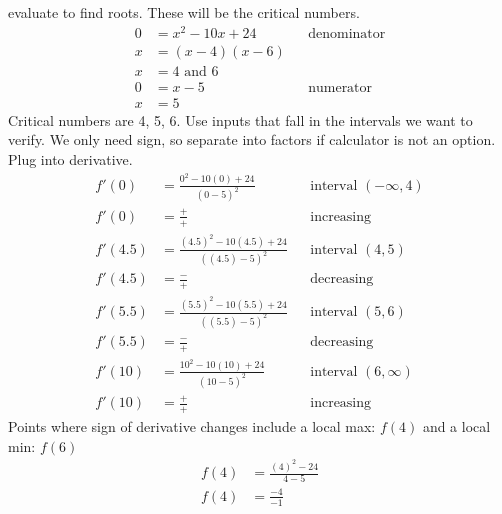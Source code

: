 \documentclass{article}
\begin{document}
\begin{description}
\begin{description}
                evaluate to find roots. These will be the critical numbers.
                \begin{align*}
                  0 & = x^2 - 10x + 24   &  & \text{denominator} \\
                  x & = (x - 4)(x - 6)                           \\
                  x & = 4 \text{ and } 6                         \\[2em]
                  0 & = x - 5            &  & \text{numerator}   \\
                  x & = 5
                \end{align*}
                Critical numbers are 4, 5, 6. Use inputs that fall in the intervals we want to verify. We only need
                sign, so separate into factors if calculator is not an option.
                Plug into derivative.
                \begin{align*}
                  f'(0)   & = \frac{0^2 - 10(0) + 24}{(0 - 5)^2}           &  & \text{interval $(-\infty, 4)$} \\
                  f'(0)   & = \frac{+}{+}                                  &  & \text{increasing}              \\[2em]
                  f'(4.5) & = \frac{(4.5)^2 - 10(4.5) + 24}{((4.5) - 5)^2} &  & \text{interval $(4, 5)$}       \\
                  f'(4.5) & = \frac{-}{+}                                  &  & \text{decreasing}              \\[2em]
                  f'(5.5) & = \frac{(5.5)^2 - 10(5.5) + 24}{((5.5) - 5)^2} &  & \text{interval $(5, 6)$}       \\
                  f'(5.5) & = \frac{-}{+}                                  &  & \text{decreasing}              \\[2em]
                  f'(10)  & = \frac{10^2 - 10(10) + 24}{(10 - 5)^2}        &  & \text{interval $(6, \infty)$}  \\
                  f'(10)  & = \frac{+}{+}                                  &  & \text{increasing}
                \end{align*}
                Points where sign of derivative changes include a local max: $f(4)$ \space and a local min: $f(6)$
                \begin{align*}
                  f(4) & = \frac{(4)^2-24}{4 - 5} \\
                  f(4) & = \frac{-4}{-1}          \\

\end{align*}
\end{description}
\end{description}
\end{document}
